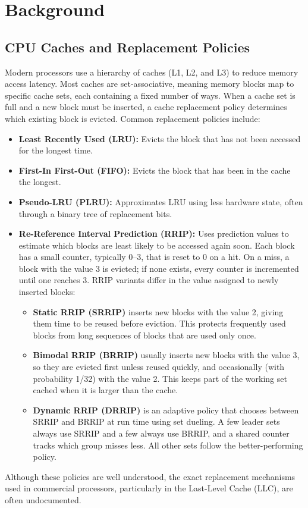 \section{Background}
\label{sec:background}

\subsection{CPU Caches and Replacement Policies}
Modern processors use a hierarchy of caches (L1, L2, and L3) to reduce memory access latency. Most caches are set-associative, meaning memory blocks map to specific cache sets, each containing a fixed number of ways. When a cache set is full and a new block must be inserted, a cache replacement policy determines which existing block is evicted.
Common replacement policies include:
\begin{itemize}
    \item \textbf{Least Recently Used (LRU):} Evicts the block that has not been accessed for the longest time.
    \item \textbf{First-In First-Out (FIFO):} Evicts the block that has been in the cache the longest.
    \item \textbf{Pseudo-LRU (PLRU):} Approximates LRU using less hardware state, often through a binary tree of replacement bits.
    \item \textbf{Re-Reference Interval Prediction (RRIP):} Uses prediction values to estimate which blocks are least likely to be accessed again soon. Each block has a small counter, typically 0--3, that is reset to 0 on a hit. On a miss, a block with the value 3 is evicted; if none exists, every counter is incremented until one reaches 3. RRIP variants differ in the value assigned to newly inserted blocks:
    \begin{itemize}
        \item \textbf{Static RRIP (SRRIP)} inserts new blocks with the value 2, giving them time to be reused before eviction. This protects frequently used blocks from long sequences of blocks that are used only once.
        \item \textbf{Bimodal RRIP (BRRIP)} usually inserts new blocks with the value 3, so they are evicted first unless reused quickly, and occasionally (with probability 1/32) with the value 2. This keeps part of the working set cached when it is larger than the cache.
        \item \textbf{Dynamic RRIP (DRRIP)} is an adaptive policy that chooses between SRRIP and BRRIP at run time using set dueling. A few leader sets always use SRRIP and a few always use BRRIP, and a shared counter tracks which group misses less. All other sets follow the better-performing policy.
    \end{itemize}
\end{itemize}
Although these policies are well understood, the exact replacement mechanisms used in commercial processors, particularly in the Last-Level Cache (LLC), are often undocumented.

